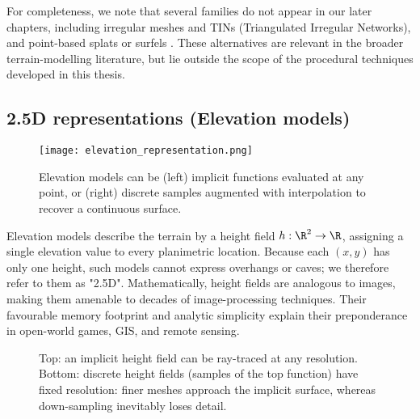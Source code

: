 For completeness, we note that several families do not appear in our later chapters, including irregular meshes and TINs (Triangulated Irregular Networks), and point-based splats or surfels \cite{Yang2005, Zhu2008, Arnone2021, Atas2022, Chen2024, Chen2025}. These alternatives are relevant in the broader terrain-modelling literature, but lie outside the scope of the procedural techniques developed in this thesis.

\subsection{2.5D representations (Elevation models)}

\begin{figure}
  \texttt{[image: elevation\_representation.png]}
  \caption{Elevation models can be (left) implicit functions evaluated at any point, or (right) discrete samples augmented with interpolation to recover a continuous surface.}
  \label{fig:erosion-elevation-representation}
\end{figure}

Elevation models describe the terrain by a height field $h : \R^{2}  \to  \R$, assigning a single elevation value to every planimetric location. Because each $(x,y)$ has only one height, such models cannot express overhangs or caves; we therefore refer to them as "2.5D". Mathematically, height fields are analogous to images, making them amenable to decades of image-processing techniques. Their favourable memory footprint and analytic simplicity explain their preponderance in open-world games, GIS, and remote sensing.

\begin{figure}
    \caption{Top: an implicit height field can be ray-traced at any resolution. Bottom: discrete height fields (samples of the top
    function) have fixed resolution: finer meshes approach the implicit surface, whereas down-sampling inevitably loses detail.}
    \label{fig:sota-representations-heights-resolutions}
\end{figure}


